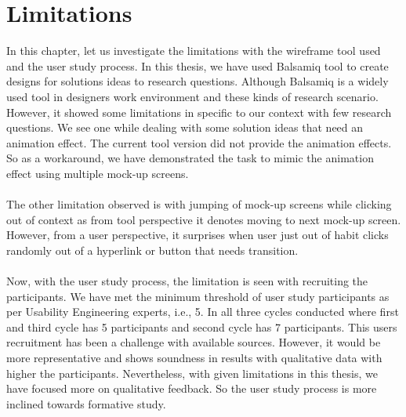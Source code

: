 \chapter{Limitations}
\label{ch:limitations_report}

In this chapter, let us investigate the limitations with the wireframe tool used and the user study process. In this thesis, we have used Balsamiq tool to create designs for solutions ideas to research questions. Although Balsamiq is a widely used tool in designers work environment and these kinds of research scenario. However, it showed some limitations in specific to our context with few research questions. We see one while dealing with some solution ideas that need an animation effect. The current tool version did not provide the animation effects. So as a workaround, we have demonstrated the task to mimic the animation effect using multiple mock-up screens. \\ \\

The other limitation observed is with jumping of mock-up screens while clicking out of context as from tool perspective it denotes moving to next mock-up screen. However, from a user perspective, it surprises when user just out of habit clicks randomly out of a hyperlink or button that needs transition. \\ \\

Now, with the user study process, the limitation is seen with recruiting the participants. We have met the minimum threshold of user study participants as per Usability Engineering experts, i.e., 5. In all three cycles conducted where first and third cycle has 5 participants and second cycle has 7 participants. This users recruitment has been a challenge with available sources. However, it would be more representative and shows soundness in results with qualitative data with higher the participants. Nevertheless, with given limitations in this thesis, we have focused more on qualitative feedback. So the user study process is more inclined towards formative study.